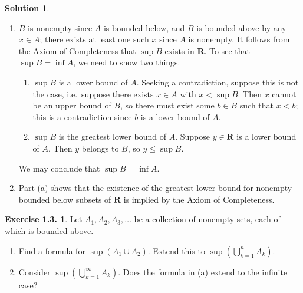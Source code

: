 \documentclass[12pt]{article}
\theoremstyle{definition}
\theoremstyle{exercise}
\newtheorem{exercise}{Exercise 1.3.}
\theoremstyle{solution}
\newtheorem*{solution}{Solution}
\newcommand{\R}{\mathbf{R}}
\begin{document}
\begin{solution}
    \begin{enumerate}
        \item \( B \) is nonempty since \( A \) is bounded below, and \( B \) is bounded above by any \( x \in A \); there exists at least one such \( x \) since \( A \) is nonempty. It follows from the Axiom of Completeness that \( \sup B \) exists in \( \R \). To see that \( \sup B = \inf A \), we need to show two things.

        \begin{enumerate}[label = (\roman*)]
            \item \( \sup B \) is a lower bound of \( A \). Seeking a contradiction, suppose this is not the case, i.e.\ suppose there exists \( x \in A \) with \( x < \sup B \). Then \( x \) cannot be an upper bound of \( B \), so there must exist some \( b \in B \) such that \( x < b \); this is a contradiction since \( b \) is a lower bound of \( A \).
    
            \item \( \sup B \) is the greatest lower bound of \( A \). Suppose \( y \in \R \) is a lower bound of \( A \). Then \( y \) belongs to \( B \), so \( y \leq \sup B \).
        \end{enumerate}
        We may conclude that \( \sup B = \inf A \).

        \item Part (a) shows that the existence of the greatest lower bound for nonempty bounded below subsets of \( \R \) is implied by the Axiom of Completeness.
    \end{enumerate}
\end{solution}

\begin{exercise}
\label{ex:4}
    Let \( A_1, A_2, A_3, \ldots \) be a collection of nonempty sets, each of which is bounded above.
    \begin{enumerate}
        \item Find a formula for \( \sup (A_1 \cup A_2) \). Extend this to \( \sup \left( \bigcup_{k=1}^n A_k \right) \).

        \item Consider \( \sup \left( \bigcup_{k=1}^{\infty} A_k \right) \). Does the formula in (a) extend to the infinite case?
    \end{enumerate}
\end{exercise}
\end{document}
